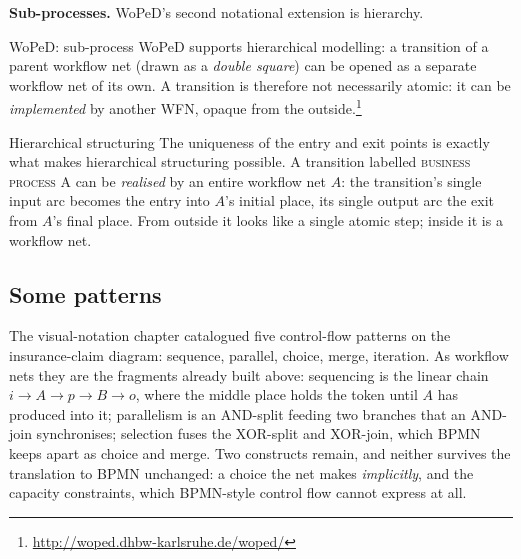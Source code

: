 \textbf{Sub-processes.} WoPeD's second notational extension is hierarchy.

\begin{examplebox}{WoPeD: sub-process}
WoPeD supports hierarchical modelling: a transition of a parent workflow net (drawn as a \emph{double square}) can be opened as a separate workflow net of its own. A transition is therefore not necessarily atomic: it can be \emph{implemented} by another WFN, opaque from the outside.\footnote{\url{http://woped.dhbw-karlsruhe.de/woped/}}
\end{examplebox}

\begin{notebox}{Hierarchical structuring}
The uniqueness of the entry and exit points is exactly what makes hierarchical structuring possible. A transition labelled \textsc{business process A} can be \emph{realised} by an entire workflow net $A$: the transition's single input arc becomes the entry into $A$'s initial place, its single output arc the exit from $A$'s final place. From outside it looks like a single atomic step; inside it is a workflow net.
\end{notebox}

\subsection{Some patterns}

The visual-notation chapter catalogued five control-flow patterns on the insurance-claim diagram: sequence, parallel, choice, merge, iteration. As workflow nets they are the fragments already built above: sequencing is the linear chain $i \to A \to p \to B \to o$, where the middle place holds the token until $A$ has produced into it; parallelism is an AND-split feeding two branches that an AND-join synchronises; selection fuses the XOR-split and XOR-join, which BPMN keeps apart as choice and merge. Two constructs remain, and neither survives the translation to BPMN unchanged: a choice the net makes \emph{implicitly}, and the capacity constraints, which BPMN-style control flow cannot express at all.

\begin{center}
\end{center}

